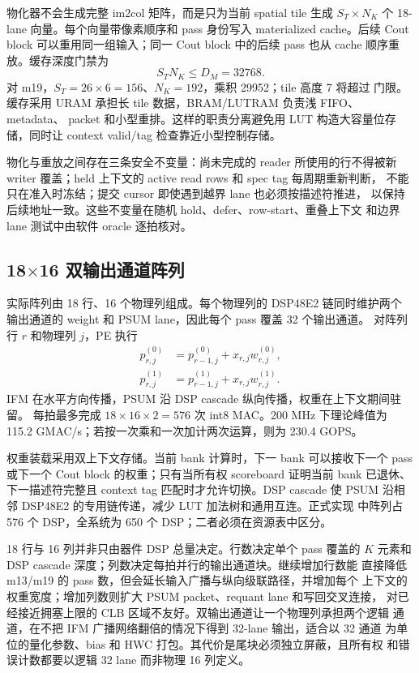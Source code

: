 

物化器不会生成完整 im2col 矩阵，而是只为当前 spatial tile 生成
$S_T\times N_K$ 个 18-lane 向量。每个向量带像素顺序和 pass 身份写入
materialized cache。后续 Cout block 可以重用同一组输入；同一 Cout block
中的后续 pass 也从 cache 顺序重放。缓存深度门禁为
\begin{equation}
S_T N_K\le D_M=32768.
\end{equation}
对 m19，$S_T=26\times6=156$、$N_K=192$，乘积 29952；tile 高度 7 将超过
门限。缓存采用 URAM 承担长 tile 数据，BRAM/LUTRAM 负责浅 FIFO、metadata、
packet 和小型重排。这样的职责分离避免用 LUT 构造大容量位存储，同时让
context valid/tag 检查靠近小型控制存储。

物化与重放之间存在三条安全不变量：尚未完成的 reader 所使用的行不得被新
writer 覆盖；held 上下文的 active read rows 和 spec tag 每周期重新判断，
不能只在准入时冻结；提交 cursor 即使遇到越界 lane 也必须按描述符推进，
以保持后续地址一致。这些不变量在随机 hold、defer、row-start、重叠上下文
和边界 lane 测试中由软件 oracle 逐拍核对。

\subsection{18$\times$16 双输出通道阵列}

实际阵列由 18 行、16 个物理列组成。每个物理列的 DSP48E2 链同时维护两个
输出通道的 weight 和 PSUM lane，因此每个 pass 覆盖 32 个输出通道。
对阵列行 $r$ 和物理列 $j$，PE 执行
\begin{align}
p^{(0)}_{r,j}&=p^{(0)}_{r-1,j}+x_{r,j}w^{(0)}_{r,j},\\
p^{(1)}_{r,j}&=p^{(1)}_{r-1,j}+x_{r,j}w^{(1)}_{r,j}.
\end{align}
IFM 在水平方向传播，PSUM 沿 DSP cascade 纵向传播，权重在上下文期间驻留。
每拍最多完成 $18\times16\times2=576$ 次 int8 MAC。200 MHz 下理论峰值为
115.2 GMAC/s；若按一次乘和一次加计两次运算，则为 230.4 GOPS。



权重装载采用双上下文存储。当前 bank 计算时，下一 bank 可以接收下一个
pass 或下一个 Cout block 的权重；只有当所有权 scoreboard 证明当前 bank
已退休、下一描述符完整且 context tag 匹配时才允许切换。DSP cascade 使
PSUM 沿相邻 DSP48E2 的专用链传递，减少 LUT 加法树和通用互连。正式实现
中阵列占 576 个 DSP，全系统为 650 个 DSP；二者必须在资源表中区分。

18 行与 16 列并非只由器件 DSP 总量决定。行数决定单个 pass 覆盖的 $K$
元素和 DSP cascade 深度；列数决定每拍并行的输出通道块。继续增加行数能
直接降低 m13/m19 的 pass 数，但会延长输入广播与纵向级联路径，并增加每个
上下文的权重宽度；增加列数则扩大 PSUM packet、requant lane 和写回交叉连接，
对已经接近拥塞上限的 CLB 区域不友好。双输出通道让一个物理列承担两个逻辑
通道，在不把 IFM 广播网络翻倍的情况下得到 32-lane 输出，适合以 32 通道
为单位的量化参数、bias 和 HWC 打包。其代价是尾块必须独立屏蔽，且所有权
和错误计数都要以逻辑 32 lane 而非物理 16 列定义。

